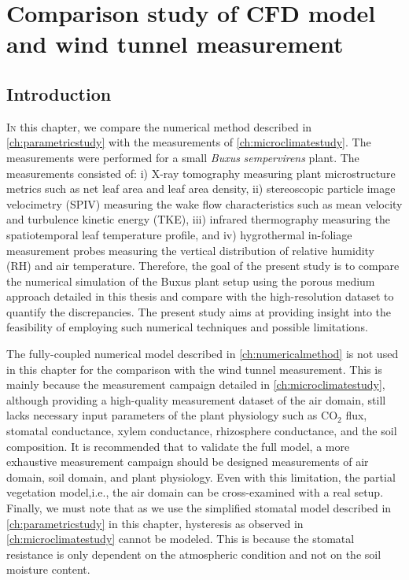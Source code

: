 \chapter{Comparison study of CFD model and wind tunnel measurement}
\label{ch:wtcfdcomparison}
\def\figdir{chapters/ch07_wtcfdcomparison/figures}	

\section{Introduction}

\lettrine[lines=3,nindent=0em,loversize=0.1]{I}{n} this chapter, we compare the numerical method described in \cref{ch:parametricstudy} with the measurements of \cref{ch:microclimatestudy}. The measurements were performed for a small \textit{Buxus} \textit{sempervirens} plant. The measurements consisted of: i) X-ray tomography measuring plant microstructure metrics such as net leaf area and leaf area density, ii) stereoscopic particle image velocimetry (SPIV) measuring the wake flow characteristics such as mean velocity and turbulence kinetic energy (TKE), iii) infrared thermography measuring the spatiotemporal leaf temperature profile, and iv) hygrothermal in-foliage measurement probes measuring the vertical distribution of relative humidity (RH) and air temperature. Therefore, the goal of the present study is to compare the numerical simulation of the Buxus plant setup using the porous medium approach detailed in this thesis and compare with the high-resolution dataset to quantify the discrepancies. The present study aims at providing insight into the feasibility of employing such numerical techniques and possible limitations.

The fully-coupled numerical model described in \cref{ch:numericalmethod} is not used in this chapter for the comparison with the wind tunnel measurement. This is mainly because the measurement campaign detailed in \cref{ch:microclimatestudy}, although providing a high-quality measurement dataset of the air domain, still lacks necessary input parameters of the plant physiology such as CO$_2$ flux, stomatal conductance, xylem conductance, rhizosphere conductance, and the soil composition. It is recommended that to validate the full model, a more exhaustive measurement campaign should be designed measurements of air domain, soil domain, and plant physiology. Even with this limitation, the partial vegetation model,i.e., the air domain can be cross-examined with a real setup. Finally, we must note that as we use the simplified stomatal model described in \cref{ch:parametricstudy} in this chapter, hysteresis as observed in \cref{ch:microclimatestudy} cannot be modeled. This is because the stomatal resistance is only dependent on the atmospheric condition and not on the soil moisture content. 

